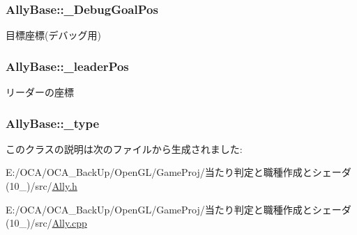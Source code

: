 \hypertarget{class_ally_base_af86598e67ba582fac7383caee977458d}{
\subsubsection[{\-\_\-\-Debug\-Goal\-Pos}]{ Ally\-Base\-::\-\_\-\-Debug\-Goal\-Pos\hspace{0.3cm}{\ttfamily [protected]}}}\label{class_ally_base_af86598e67ba582fac7383caee977458d}


目標座標(デバッグ用) 

\hypertarget{class_ally_base_a645bdf98a2819d860f30637ffa82fe35}{
\subsubsection[{\-\_\-leader\-Pos}]{ Ally\-Base\-::\-\_\-leader\-Pos\hspace{0.3cm}{\ttfamily [protected]}}}\label{class_ally_base_a645bdf98a2819d860f30637ffa82fe35}


リーダーの座標 

\hypertarget{class_ally_base_a404a0b9f3665f8428e8f4605c11b4aa8}{
\subsubsection[{\-\_\-type}]{ Ally\-Base\-::\-\_\-type\hspace{0.3cm}{\ttfamily [protected]}}}\label{class_ally_base_a404a0b9f3665f8428e8f4605c11b4aa8}


このクラスの説明は次のファイルから生成されました\-:\begin{DoxyCompactItemize}
\item 
E\-:/\-O\-C\-A/\-O\-C\-A\-\_\-\-Back\-Up/\-Open\-G\-L/\-Game\-Proj/当たり判定と職種作成とシェーダ(10\-\_)/src/\hyperlink{_ally_8h}{Ally.\-h}\item 
E\-:/\-O\-C\-A/\-O\-C\-A\-\_\-\-Back\-Up/\-Open\-G\-L/\-Game\-Proj/当たり判定と職種作成とシェーダ(10\-\_)/src/\hyperlink{_ally_8cpp}{Ally.\-cpp}\end{DoxyCompactItemize}

